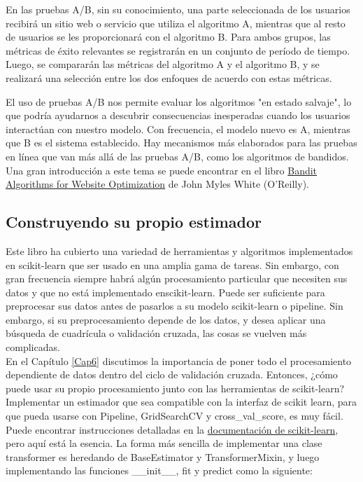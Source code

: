 En las pruebas A/B, sin su conocimiento, una parte seleccionada de los usuarios recibirá
un sitio web o servicio que utiliza el algoritmo A, mientras que al resto de usuarios se les proporcionará
con el algoritmo B. Para ambos grupos, las métricas de éxito relevantes se registrarán en un conjunto de 
período de tiempo. Luego, se compararán las métricas del algoritmo A y el algoritmo B,
y se realizará una selección entre los dos enfoques de acuerdo con estas métricas.

El uso de pruebas A/B nos permite evaluar los algoritmos "{}en estado salvaje"{}, lo que podría ayudarnos a descubrir consecuencias inesperadas cuando los usuarios interactúan con nuestro modelo.
Con frecuencia, el modelo nuevo es A, mientras que B es el sistema establecido.  Hay mecanismos más elaborados para las pruebas en línea que van más allá de las pruebas A/B, como los algoritmos de bandidos. Una gran introducción a este tema se puede encontrar en el libro  \href{http://shop.oreilly.com/product/0636920027393.do}{\textcolor{vino}{ Bandit Algorithms for Website Optimization}} de John Myles White (O'Reilly).



\subsection{Construyendo su propio estimador} 

Este libro ha cubierto una variedad de herramientas y algoritmos implementados en {\ttfamily scikit-learn} que ser usado en una amplia gama de tareas. Sin embargo, con gran frecuencia siempre  habrá algún procesamiento particular que necesiten  sus datos y que no está implementado en{\ttfamily scikit-learn}. 
Puede ser suficiente para preprocesar sus datos antes de pasarlos a su modelo {\ttfamily scikit-learn} o pipeline. Sin embargo, si su preprocesamiento depende de los datos, y desea aplicar una búsqueda de cuadrícula o validación cruzada, las cosas se vuelven más complicadas.\\

En el  Capítulo \ref{Cap6}  discutimos la importancia de poner todo el procesamiento dependiente de datos
dentro del ciclo de validación cruzada. Entonces, ¿cómo puede usar su propio procesamiento junto con las herramientas de {\ttfamily scikit-learn}?     Implementar un estimador que sea compatible con la interfaz de {\ttfamily scikit learn}, para que pueda usarse con  {\ttfamily Pipeline, GridSearchCV}  y {\ttfamily cross\_val\_score}, es muy fácil. 
Puede encontrar instrucciones detalladas en la \href{https://scikit-learn.org/stable/developers/contributing.html#rolling-your-own-estimator}{\textcolor{vino}{documentación de  {\ttfamily scikit-learn}}}, pero aquí está la esencia.
La forma más sencilla de implementar una clase transformer   es heredando de {\ttfamily BaseEstimator} y {\ttfamily TransformerMixin}, y luego implementando las funciones {\ttfamily \_\_init\_\_, fit y predict} como la siguiente:





